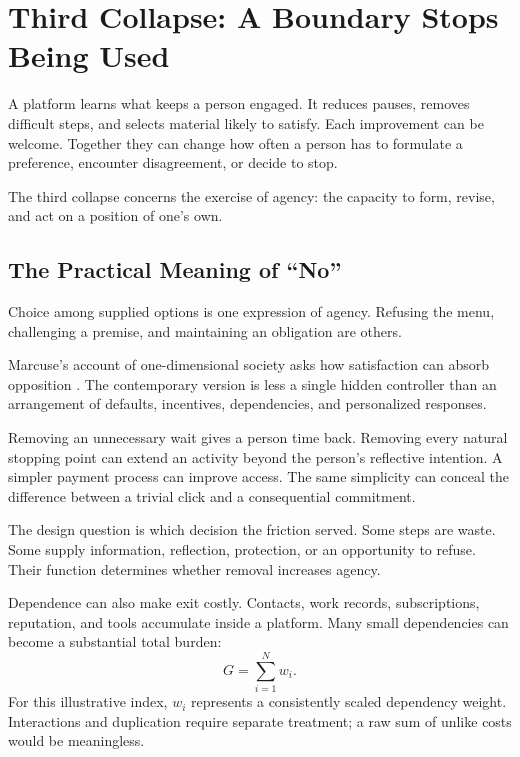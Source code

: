 \section{Third Collapse: A Boundary Stops Being Used}

A platform learns what keeps a person engaged. It reduces pauses, removes difficult steps, and selects material likely to satisfy. Each improvement can be welcome. Together they can change how often a person has to formulate a preference, encounter disagreement, or decide to stop.

The third collapse concerns the exercise of agency: the capacity to form, revise, and act on a position of one's own.

\subsection{The Practical Meaning of “No”}

Choice among supplied options is one expression of agency. Refusing the menu, challenging a premise, and maintaining an obligation are others.

Marcuse's account of one-dimensional society asks how satisfaction can absorb opposition \cite{marcuse1964onedimensional}. The contemporary version is less a single hidden controller than an arrangement of defaults, incentives, dependencies, and personalized responses.

Removing an unnecessary wait gives a person time back. Removing every natural stopping point can extend an activity beyond the person's reflective intention. A simpler payment process can improve access. The same simplicity can conceal the difference between a trivial click and a consequential commitment.

The design question is which decision the friction served. Some steps are waste. Some supply information, reflection, protection, or an opportunity to refuse. Their function determines whether removal increases agency.

Dependence can also make exit costly. Contacts, work records, subscriptions, reputation, and tools accumulate inside a platform. Many small dependencies can become a substantial total burden:
\begin{equation}
 G=\sum_{i=1}^{N}w_i.
\end{equation}
For this illustrative index, $w_i$ represents a consistently scaled dependency weight. Interactions and duplication require separate treatment; a raw sum of unlike costs would be meaningless.

